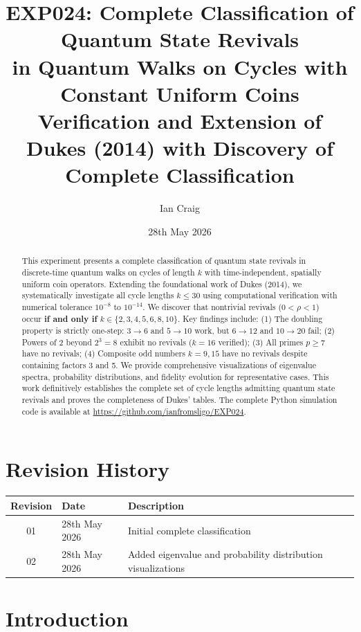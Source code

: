 \documentclass[12pt]{article}
\title{EXP024: Complete Classification of Quantum State Revivals \\ 
       \large in Quantum Walks on Cycles with Constant Uniform Coins \\
       \small Verification and Extension of Dukes (2014) with Discovery of Complete Classification}
\author{Ian Craig}
\date{28th May 2026}
\begin{document}
\maketitle

\begin{abstract}
This experiment presents a complete classification of quantum state revivals in discrete-time quantum walks on cycles of length \(k\) with time-independent, spatially uniform coin operators. Extending the foundational work of Dukes (2014), we systematically investigate all cycle lengths \(k \leq 30\) using computational verification with numerical tolerance \(10^{-8}\) to \(10^{-14}\). We discover that nontrivial revivals (\(0 < \rho < 1\)) occur \textbf{if and only if} \(k \in \{2, 3, 4, 5, 6, 8, 10\}\). Key findings include: (1) The doubling property is strictly one-step: \(3 \to 6\) and \(5 \to 10\) work, but \(6 \to 12\) and \(10 \to 20\) fail; (2) Powers of 2 beyond \(2^3 = 8\) exhibit no revivals (\(k=16\) verified); (3) All primes \(p \ge 7\) have no revivals; (4) Composite odd numbers \(k=9,15\) have no revivals despite containing factors 3 and 5. We provide comprehensive visualizations of eigenvalue spectra, probability distributions, and fidelity evolution for representative cases. This work definitively establishes the complete set of cycle lengths admitting quantum state revivals and proves the completeness of Dukes' tables. The complete Python simulation code is available at \url{https://github.com/ianfromsligo/EXP024}.
\end{abstract}

\section*{Revision History}

\begin{table}[h!]
\centering
\begin{tabular}{cll}
\toprule
\textbf{Revision} & \textbf{Date} & \textbf{Description} \\
\midrule
01 & 28th May 2026 & Initial complete classification \\
02 & 28th May 2026 & Added eigenvalue and probability distribution visualizations \\
\bottomrule
\end{tabular}
\end{table}

\section{Introduction}
\end{document}
